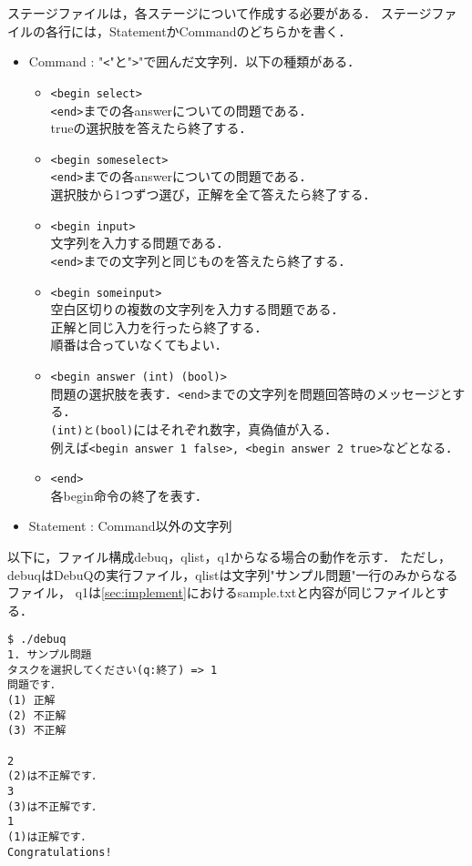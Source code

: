 \documentclass{jreport}
\begin{document}
ステージファイルは，各ステージについて作成する必要がある．
ステージファイルの各行には，StatementかCommandのどちらかを書く．
\begin{itemize}
  \item Command : "\verb|<|"と"\verb|>|"で囲んだ文字列．以下の種類がある．
    \begin{itemize}
    \item \verb|<begin select>|\\
      \verb|<end>|までの各answerについての問題である．\\
      trueの選択肢を答えたら終了する．
    \item \verb|<begin someselect>|\\
      \verb|<end>|までの各answerについての問題である．\\
      選択肢から1つずつ選び，正解を全て答えたら終了する．
    \item \verb|<begin input>|\\
      文字列を入力する問題である．\\
      \verb|<end>|までの文字列と同じものを答えたら終了する．
    \item \verb|<begin someinput>|\\
      空白区切りの複数の文字列を入力する問題である．\\
      正解と同じ入力を行ったら終了する．\\
      順番は合っていなくてもよい．
    \item \verb|<begin answer (int) (bool)>|\\
    問題の選択肢を表す．\verb|<end>|までの文字列を問題回答時のメッセージとする．\\
      \verb|(int)と(bool)|にはそれぞれ数字，真偽値が入る．\\
      例えば\verb|<begin answer 1 false>, <begin answer 2 true>|などとなる．
    \item \verb|<end>|\\
      各begin命令の終了を表す．
    \end{itemize}
  \item Statement : Command以外の文字列
\end{itemize}

以下に，ファイル構成debuq，qlist，q1からなる場合の動作を示す．
ただし，debuqはDebuQの実行ファイル，qlistは文字列"サンプル問題"一行のみからなるファイル，
q1は\ref{sec:implement}におけるsample.txtと内容が同じファイルとする．
\begin{verbatim}
$ ./debuq
1. サンプル問題
タスクを選択してください(q:終了) => 1
問題です．
(1) 正解
(2) 不正解
(3) 不正解

2
(2)は不正解です．
3
(3)は不正解です．
1
(1)は正解です．
Congratulations!
\end{verbatim}
\end{document}

